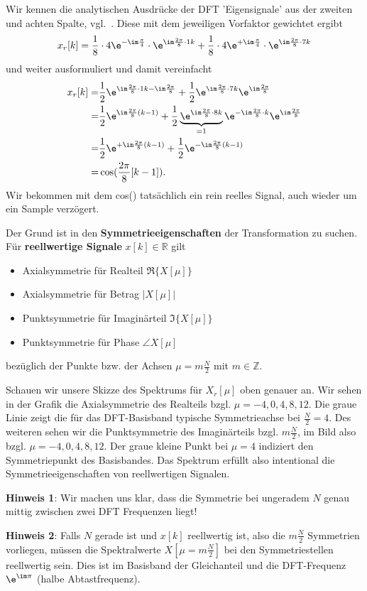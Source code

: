 \begin{ExCalc}
Wir kennen die analytischen Ausdrücke der DFT 'Eigensignale' aus der zweiten
und achten Spalte, vgl.~.
Diese mit dem jeweiligen Vorfaktor gewichtet ergibt
\begin{align}
x_r[k]
=
\frac{1}{8} \cdot 4 \e^{-\im\frac{\pi}{4}} \cdot  \e^{\im \frac{2\pi}{8}\cdot 1 k}+
\frac{1}{8} \cdot 4 \e^{+\im\frac{\pi}{4}} \cdot  \e^{\im \frac{2\pi}{8}\cdot 7 k}
\end{align}
%
und weiter ausformuliert und damit vereinfacht
\begin{align}
x_r[k]
=
&\frac{1}{2} \e^{\im \frac{2\pi}{8}\cdot 1 k - \im\frac{2\pi}{8}}+
\frac{1}{2} \e^{\im \frac{2\pi}{8}\cdot 7 k} \e^{\im\frac{2\pi}{8}}\\
=
&\frac{1}{2} \e^{\im \frac{2\pi}{8} (k-1)}+
\frac{1}{2} \underbrace{\e^{\im \frac{2\pi}{8}\cdot 8 k}}_{=1} \e^{- \im \frac{2\pi}{8}\cdot k} \e^{\im\frac{2\pi}{8}}\\
=
&\frac{1}{2} \e^{+\im \frac{2\pi}{8} (k-1)}+
\frac{1}{2} \e^{-\im \frac{2\pi}{8} (k-1)}\\
=
&\cos(\frac{2\pi}{8} [k-1]).
\end{align}
Wir bekommen mit dem cos() tatsächlich ein rein reelles Signal, auch wieder
um ein Sample verzögert.

Der Grund ist in den \textbf{Symmetrieeigenschaften} der Transformation zu
suchen. Für \textbf{reellwertige Signale} $x[k]\in\mathbb{R}$ gilt
\begin{itemize}
  \item Axialsymmetrie für Realteil $\Re\{X[\mu]\}$
  \item Axialsymmetrie für Betrag $|X[\mu]|$
  \item Punktsymmetrie für Imaginärteil $\Im\{X[\mu]\}$
  \item Punktsymmetrie für Phase $\angle X[\mu]$
\end{itemize}
bezüglich der Punkte bzw. der Achsen $\mu = m \frac{N}{2}$ mit $m\in\mathbb{Z}$.

Schauen wir unsere Skizze des Spektrums für $X_r[\mu]$ oben genauer an.
Wir sehen in der Grafik die Axialsymmetrie des Realteils
bzgl. $\mu=-4,0,4,8,12$. Die graue
Linie zeigt die für das DFT-Basisband typische Symmetrieachse bei $\frac{N}{2}=4$.
Des weiteren sehen wir die Punktsymmetrie des Imaginärteils bzgl. $m \frac{N}{2}$,
im Bild also bzgl. $\mu=-4,0,4,8,12$. Der graue kleine Punkt bei $\mu=4$ indiziert
den Symmetriepunkt des Basisbandes.
Das Spektrum erfüllt also intentional
die Symmetrieeigenschaften von reellwertigen Signalen.

\textbf{Hinweis 1}: Wir machen uns klar, dass die Symmetrie bei ungeradem $N$
genau mittig zwischen zwei DFT Frequenzen liegt!

\textbf{Hinweis 2}:
Falls $N$ gerade ist und $x[k]$ reellwertig ist, also die $m \frac{N}{2}$
Symmetrien vorliegen, müssen die Spektralwerte $X[\mu = m \frac{N}{2}]$
bei den Symmetriestellen reellwertig sein.
Dies ist im Basisband der Gleichanteil und die DFT-Frequenz
$\e^{\im\pi}$ (halbe Abtastfrequenz).
\end{ExCalc}





